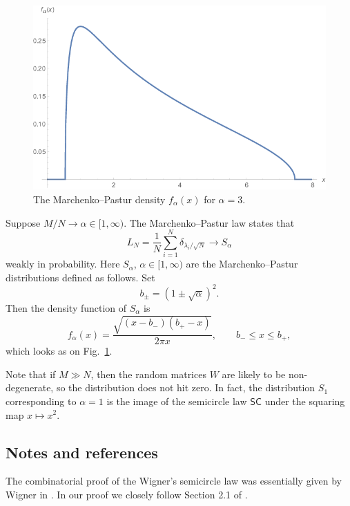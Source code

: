 \documentclass[letterpaper,11pt,oneside,reqno]{amsart}
\numberwithin{equation}{section}
\newcommand{\SC}{\mathsf{SC}}
\theoremstyle{definition}
\begin{document}
\begin{figure}[htbp]
	\includegraphics[width=.5\textwidth]{img/Marchenko-Pastur.png}
	\caption{The Marchenko--Pastur density $f_\alpha(x)$ for $\alpha=3$.}
	\label{fig:MP_law}
\end{figure}

Suppose $ M / N \to \alpha \in [ 1, \infty ) $. The Marchenko--Pastur law states that
\begin{equation*}
L_N = \frac{ 1 }{ N } \sum_{ i = 1 }^N \delta_{ \lambda_i / \sqrt{N} } \to S_\alpha 
\end{equation*}
weakly in probability. Here
$ S_\alpha $, $\alpha\in[1,\infty)$ are the Marchenko--Pastur distributions defined as follows.
Set
\begin{equation*}
b_\pm = ( 1 \pm \sqrt{\alpha} )^2.
\end{equation*}
Then the density function of $ S_\alpha $ is
\begin{equation*}
f_\alpha( x ) = \frac{ \sqrt{ ( x - b_- ) ( b_+ - x ) } }{ 2 \pi x }, \qquad b_- \le x \le b_+,
\end{equation*}
which looks as on Fig.~\ref{fig:MP_law}.

Note that if $ M \gg N $, then the random matrices $W$ are likely to be non-degenerate, so the distribution does not hit zero.
In fact, the distribution $ S_1 $ corresponding to $\alpha=1$
is the image of the semicircle law $ \SC $ under the squaring map $ x \mapsto x^2 $.



\subsection{Notes and references} %
\label{sub:notes_WSCL}

The combinatorial proof of the Wigner's semicircle law was essentially given by Wigner 
in \cite{wigner1955characteristic}. In our proof we closely follow Section 2.1 of
\cite{AndersonGuionnetZeitouniBook}.
\end{document}

